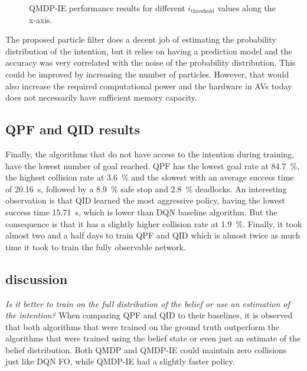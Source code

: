 	\begin{figure}[!t]
		\centering
			\caption{QMDP-IE performance results for different $i_\text{threshold}$ values along the x-axis.}
		\label{fig:intent_threshold}
	\end{figure}

	The proposed particle filter does a decent job of estimating the probability distribution of the intention, but it relies on having a prediction model and the accuracy was very correlated with the noise of the probability distribution. 
	This could be improved by increasing the number of particles. However, that would also increase the required computational power and the hardware in AVs today does not necessarily have sufficient memory capacity. 
	
	\subsection{QPF and QID results}
	Finally, the algorithms that do not have access to the intention during training, have the lowest number of goal reached. QPF has the lowest goal rate at \SI{84.7}{\percent}, the highest collision rate at \SI{3.6}{\percent} and the slowest with an average success time of \SI{20.16}{\second}, followed by a \SI{8.9}{\percent} safe stop and \SI{2.8}{\percent} deadlocks. An interesting observation is that QID learned the most aggressive policy, having the lowest success time \SI{15.71}{\second}, which is lower than DQN baseline algorithm. But the consequence is that it has a slightly higher collision rate at \SI{1.9}{\percent}. Finally, it took almost two and a half days to train QPF and QID which is almost twice as much time it took to train the fully observable network. 
	
	

	
	\subsection{discussion}
	\label{sec:discussion}

	\textit{Is it better to train on the full distribution of the belief or use an estimation of the intention?} When comparing QPF and QID to their baselines, it is observed that both algorithms that were trained on the ground truth outperform the algorithms that were trained using the belief state or even just an estimate of the belief distribution. Both QMDP and QMDP-IE could maintain zero collisions just like DQN FO, while QMDP-IE had a slightly faster policy. 
	
